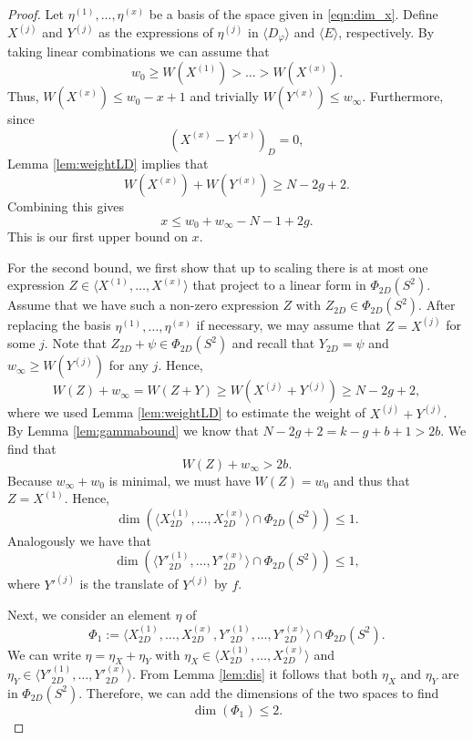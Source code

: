 \documentclass[12pt]{amsart}
\renewcommand{\leq}{\leqslant}
\renewcommand{\geq}{\geqslant}
\theoremstyle{definition}
\newcommand{\divi}[1]{\langle #1 \rangle}
\begin{document}
\begin{proof}
		Let $\eta^{(1)}, \ldots, \eta^{(x)}$ be a basis of the space given in \eqref{eqn:dim_x}. Define $X^{(j)}$ and $Y^{(j)}$ as the expressions of $\eta^{(j)}$ in $\divi {D_\varphi}$ and $\divi {E}$, respectively. By taking linear combinations we can assume that
		$$w_0 \geq W(X^{(1)}) > \ldots > W(X^{(x)}).$$ 
		Thus, $W(X^{(x)}) \leq w_0 - x + 1$ and trivially $W(Y^{(x)}) \leq w_\infty$. Furthermore, since 
		$$\left(X^{(x)} - Y^{(x)}\right)_D = 0,$$ 
		Lemma \ref{lem:weightLD} implies that 
		$$W\left(X^{(x)}\right) + W\left(Y^{(x)}\right) \geq N - 2g + 2.$$ 
		Combining this gives
		$$x \leq w_0 + w_\infty - N - 1 + 2g.$$ 
		This is our first upper bound on $x$.
		
		For the second bound, we first show that up to scaling there is at most one expression $Z \in \langle X^{(1)}, \ldots, X^{(x)} \rangle$ that project to a linear form in $\Phi_{2D}(S^2)$. Assume that we have such a non-zero expression $Z$ with $Z_{2D} \in \Phi_{2D}(S^2)$. After replacing the basis $\eta^{(1)}, \ldots, \eta^{(x)}$ if necessary, we may assume that $Z = X^{(j)}$ for some $j$. Note that $Z_{2D} + \psi\in \Phi_{2D}(S^2)$  and recall that $Y_{2D} = \psi$ and $w_\infty \geq W(Y^{(j)})$ for any $j$. Hence,
		$$W(Z) + w_\infty = W(Z+Y) \geq W\left( X^{(j)} + Y^{(j)} \right) \geq N - 2g + 2,$$
		where we used Lemma \ref{lem:weightLD} to estimate the weight of $X^{(j)} + Y^{(j)}$. By Lemma \ref{lem:gammabound} we know that $N-2g+2 = k - g + b + 1 > 2b$. We find that
		$$W(Z) + w_\infty > 2b.$$ 
		Because $w_\infty + w_0$ is minimal, we must have $W(Z) = w_0$ and thus that $Z = X^{(1)}$. Hence,
		$$\dim\left( \langle X^{(1)}_{2D}, \ldots, X^{(x)}_{2D} \rangle \cap \Phi_{2D}(S^2) \right) \leq 1.$$ 
		Analogously we have that 
		$$\dim\left( \langle Y'^{(1)}_{2D}, \ldots, Y'^{(x)}_{2D} \rangle \cap \Phi_{2D}(S^2) \right) \leq 1,$$ 
		where $Y'^{(j)}$ is the translate of $Y^{(j)}$ by $f$. 
		
		Next, we consider an element $\eta$ of 
		$$\Phi_1 := \langle X^{(1)}_{2D}, \ldots, X^{(x)}_{2D}, Y'^{(1)}_{2D}, \ldots, Y'^{(x)}_{2D} \rangle \cap \Phi_{2D}(S^2).$$
		We can write $\eta = \eta_X + \eta_Y$ with $\eta_X \in \langle X^{(1)}_{2D}, \ldots, X^{(x)}_{2D} \rangle$ and $\eta_Y \in \langle Y'^{(1)}_{2D}, \ldots, Y'^{(x)}_{2D} \rangle.$ From Lemma \ref{lem:dis} it follows that both $\eta_X$ and $\eta_Y$ are in $\Phi_{2D}(S^2)$. Therefore, we can add the dimensions of the two spaces to find
		$$\dim \left( \Phi_1 \right) \leq 2.$$ 
		

\end{proof}
\end{document}
